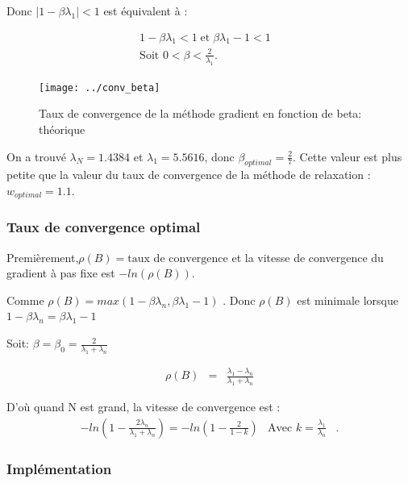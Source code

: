 \documentclass[a4paper,11pt]{article}
\begin{document}
Donc $|1-\beta \lambda_1|<1$ est équivalent à : 

\begin{eqnarray*}
  1-\beta \lambda_1<1\; \text{et} \; \beta \lambda_1-1<1& \\
  \text{Soit } 0<\beta<\frac{2}{\lambda_1}.&
\end{eqnarray*}


\begin{figure}[h!]
  \begin{centering}
    \texttt{[image: ../conv\_beta]}
    \label{rspro2}
    \par\end{centering}
  \caption{Taux de convergence de la méthode gradient en fonction de beta: théorique}
  \label{fig:jacobi-conv}
\end{figure}

On     a    trouvé     $\lambda_N=1.4384$     et    $\lambda_1=5.5616$,     donc
$\beta_{optimal}=\frac{2}{7}$.  Cette  valeur est plus  petite que la valeur du
taux de convergence de la méthode de relaxation : $w_{optimal}=1.1$.  


\subsubsection{Taux de convergence optimal}

Premièrement,$\rho(B)=\text{taux de  convergence}$ et la  vitesse de convergence
du gradient à pas fixe est $-ln(\rho(B))$.

Comme $\rho(B) = max(1-\beta \lambda_n,\beta\lambda_1-1)$ .
Donc $\rho(B)$ est minimale lorsque $1-\beta\lambda_n=\beta\lambda_1-1$

Soit: $\beta=\beta_0=\frac{2}{\lambda_1+\lambda_n}$

\begin{eqnarray*}
  \rho(B)&=&\frac{\lambda_1-\lambda_n}{\lambda_1+\lambda_n}
\end{eqnarray*}



D'où quand N est grand, la vitesse de convergence est :
\begin{eqnarray*}
  -ln(1-\frac{2\lambda_n}{\lambda_1+\lambda_n})=-ln(1-\frac{2}{1-k}) &\text{Avec } k=\frac{\lambda_1}{\lambda_n}&.
\end{eqnarray*}

\subsubsection{Implémentation}
\end{document}
